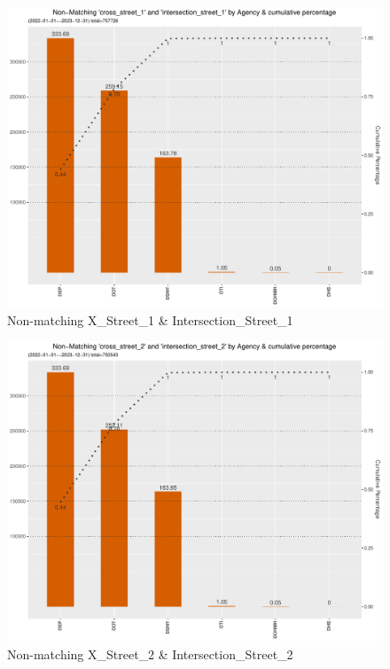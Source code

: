 \documentclass[12pt, titlepage]{article}
\begin{document}
\begin{figure}[tbp]
	\centering
	\includegraphics[width = \textwidth]
	{non-matchingcross_street_1andintersection_street_1.pdf}
	\caption{Non-matching X\_Street\_1 \& Intersection\_Street\_1}
	\label{fig:xstreet1}
\end{figure}	

\begin{figure}[tbp]
	\centering
	\includegraphics[width = \textwidth]
	{non-matchingcross_street_2andintersection_street_2.pdf}
	\caption{Non-matching X\_Street\_2 \& Intersection\_Street\_2}
	\label{fig:xstreet2}
\end{figure}	
\end{document}
